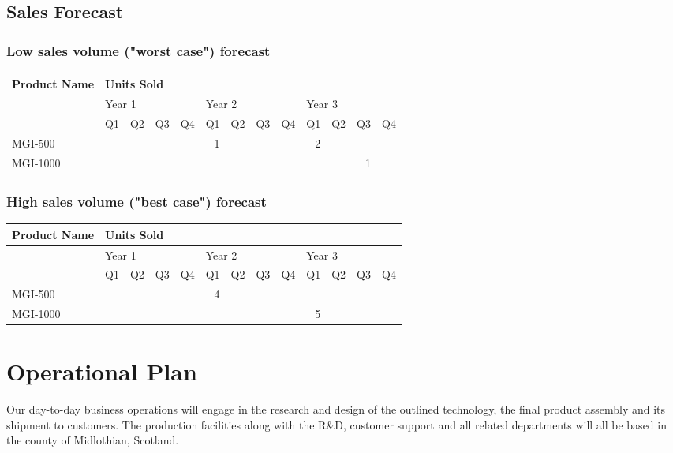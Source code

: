 \documentclass[a4paper,11pt]{article}
\begin{document}
\subsection{Sales Forecast}

\subsubsection{Low sales volume ("worst case") forecast}
\begin{tabular}{l | r r r r | r r r r | r r r r}
Product Name & \multicolumn{12}{l}{Units Sold} \\
\hline
& \multicolumn{4}{l}{Year 1} & \multicolumn{4}{l}{Year 2} & \multicolumn{4}{l}{Year 3} \\
& Q1 & Q2 & Q3 & Q4 & Q1 & Q2 & Q3 & Q4 & Q1 & Q2 & Q3 & Q4 \\
\hline
MGI-500 & & & & & 1 & & & & 2 & & &\\
MGI-1000 & & & & & & & & & & & 1 &\\
\end{tabular}

\subsubsection{High sales volume ("best case") forecast}
\begin{tabular}{l | r r r r | r r r r | r r r r}
Product Name & \multicolumn{12}{l}{Units Sold} \\
\hline
& \multicolumn{4}{l}{Year 1} & \multicolumn{4}{l}{Year 2} & \multicolumn{4}{l}{Year 3} \\
& Q1 & Q2 & Q3 & Q4 & Q1 & Q2 & Q3 & Q4 & Q1 & Q2 & Q3 & Q4 \\
\hline
MGI-500 & & & & & 4 & & & & & & &\\
MGI-1000 & & & & & & & & & 5 & & &\\
\end{tabular}

\pagebreak

\section{Operational Plan}
Our day-to-day business operations will engage in the research and design of the outlined technology, the final product assembly and its shipment to customers. The production facilities along with the R\&D, customer support and all related departments will all be based in the county of Midlothian, Scotland.
\end{document}

